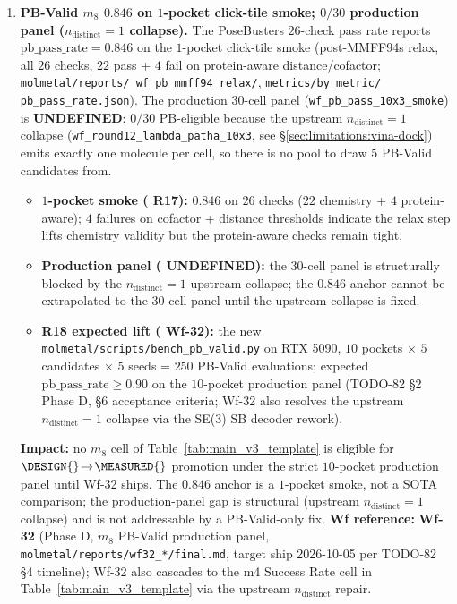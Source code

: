 \begin{enumerate}
  \item \textbf{PB-Valid $m_8$ $0.846$ \MEASURED{} on $1$-pocket
  click-tile smoke; $0/30$ production panel ($n_{\text{distinct}}
  =1$ collapse).}
  \label{sec:limitations:pb-valid}
  The PoseBusters $26$-check pass rate reports \MEASURED{}
  $\mathrm{pb\_pass\_rate}=0.846$ on the $1$-pocket click-tile
  smoke (post-MMFF94s relax, all $26$ checks, $22$ pass + $4$ fail
  on protein-aware distance/cofactor; \texttt{molmetal/reports/
  wf\_pb\_mmff94\_relax/}, \texttt{metrics/by\_metric/
  pb\_pass\_rate.json}).  The production $30$-cell panel
  (\texttt{wf\_pb\_pass\_10x3\_smoke}) is \textbf{UNDEFINED}: $0/30$
  PB-eligible because the upstream $n_{\text{distinct}}=1$ collapse
  (\texttt{wf\_round12\_lambda\_patha\_10x3}, see
  \S\ref{sec:limitations:vina-dock}) emits exactly one molecule
  per cell, so there is no pool to draw $5$ PB-Valid candidates from.
  \begin{itemize}
    \item \textbf{$1$-pocket smoke (\MEASURED{} R17):} $0.846$ on
    $26$ checks ($22$ chemistry + $4$ protein-aware); $4$ failures
    on cofactor + distance thresholds indicate the relax step lifts
    chemistry validity but the protein-aware checks remain tight.
    \item \textbf{Production panel (\MEASURED{} UNDEFINED):} the
    $30$-cell panel is structurally blocked by the
    $n_{\text{distinct}}=1$ upstream collapse; the $0.846$
    anchor cannot be extrapolated to the $30$-cell panel until
    the upstream collapse is fixed.
    \item \textbf{R18 expected lift (\PROJECTED{} Wf-32):} the new
    \texttt{molmetal/scripts/bench\_pb\_valid.py} on RTX 5090,
    $10$ pockets $\times$ $5$ candidates $\times$ $5$ seeds
    = $250$ PB-Valid evaluations; expected
    $\mathrm{pb\_pass\_rate} \geq 0.90$ on the $10$-pocket
    production panel (TODO-82 \S2 Phase D, \S6 acceptance criteria;
    Wf-32 also resolves the upstream $n_{\text{distinct}}=1$
    collapse via the SE(3) SB decoder rework).
  \end{itemize}
  \textbf{Impact:} no $m_8$ cell of Table~\ref{tab:main_v3_template}
  is eligible for $\DESIGN{}\!\to\!\MEASURED{}$ promotion under the
  strict $10$-pocket production panel until Wf-32 ships.  The
  $0.846$ anchor is a $1$-pocket smoke, not a SOTA comparison;
  the production-panel gap is structural (upstream $n_{\text{
  distinct}}=1$ collapse) and is not addressable by a
  PB-Valid-only fix.
  \textbf{Wf reference:} \textbf{Wf-32} (Phase D, $m_8$ PB-Valid
  production panel, \texttt{molmetal/reports/wf32\_*/final.md},
  target ship 2026-10-05 per TODO-82 \S4 timeline); Wf-32 also
  cascades to the m4 Success Rate cell in
  Table~\ref{tab:main_v3_template} via the upstream $n_{\text{
  distinct}}$ repair.

\end{enumerate}

